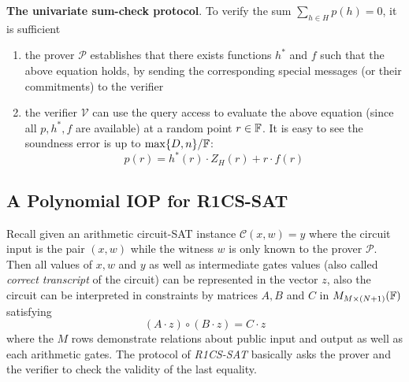 \documentclass{article}
\begin{document}
\textbf{The univariate sum-check protocol}. To verify the sum $\sum \limits_{h \in H} p(h) = 0$, it is sufficient
\begin{enumerate}
\item\label{item:108} the prover $\mathcal{P}$ establishes that there exists functions $h^{\displaystyle *}$ and $f$ such that the above equation holds, by sending the corresponding special messages (or their commitments) to the verifier 
\item\label{item:109} the verifier $\mathcal{V}$ can use the query access to evaluate the above equation (since all $p, h^{\displaystyle *}, f$ are available) at a random point $r \in \mathbb{F}$. It is easy to see the soundness error is up to $\max\{D, n\} / \mathbb{F}$:
\begin{equation*}
p(r) = h^{\displaystyle *}(r) \cdot Z_H(r) + r \cdot f(r)
\end{equation*}
\end{enumerate}

\subsection{A Polynomial IOP for R1CS-SAT}

Recall given an arithmetic circuit-SAT instance $\mathcal{C}(x, w) = y$ where the circuit input is the pair $(x, w)$ while the witness $w$ is only known to the prover $\mathcal{P}$. Then all values of $x, w$ and $y$ as well as intermediate gates values (also called \textit{correct transcript} of the circuit) can be represented in the vector $z$, also the circuit can be interpreted in constraints by matrices $A, B$ and $C$ in $M_{M \times (N+1)}(\mathbb{F})$ satisfying
\begin{equation*}
(A \cdot z) \circ (B \cdot z) = C \cdot z
\end{equation*}
where the $M$ rows demonstrate relations about public input and output as well as each arithmetic gates. The protocol of \textit{R1CS-SAT} basically asks the prover and the verifier to check the validity of the last equality. 
\end{document}
